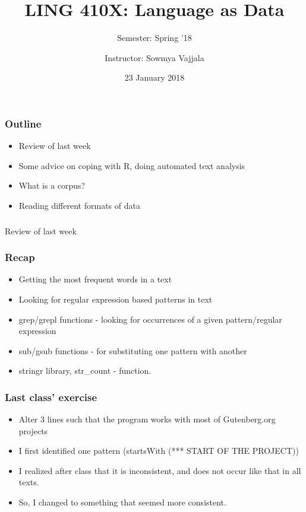 \documentclass{beamer}
\author[Sowmya Vajjala]{Instructor: Sowmya Vajjala}
\title[LING 410X]{LING 410X: Language as Data}
\subtitle{Semester: Spring '18}
\date{23 January 2018}
\institute{Iowa State University, USA}
\begin{document}
\begin{frame}\titlepage
\end{frame}


\begin{frame}
\frametitle{Outline}
\begin{itemize}
\item Review of last week
\item Some advice on coping with R, doing automated text analysis
\item What is a corpus?
\item Reading different formats of data
\end{itemize}
\end{frame}

\begin{frame}
\frametitle{}
\centering Review of last week
\end{frame}

\begin{frame}
\frametitle{Recap}
\begin{itemize}
\item Getting the most frequent words in a text
\item Looking for regular expression based patterns in text
\item grep/grepl functions - looking for occurrences of a given pattern/regular expression
\item sub/gsub functions - for substituting one pattern with another
\item stringr library, str\_count - function.
\end{itemize}  
\end{frame}

\begin{frame}
\frametitle{Last class' exercise}
\begin{itemize}
\item Alter 3 lines such that the program works with most of Gutenberg.org projects
\item I first identified one pattern (startsWith (*** START OF THE PROJECT)) \pause
\item I realized after class that it is inconsistent, and does not occur like that in all texts.
\item So, I changed to something that seemed more consistent.
\end{itemize}  
\end{frame}
\end{document}
